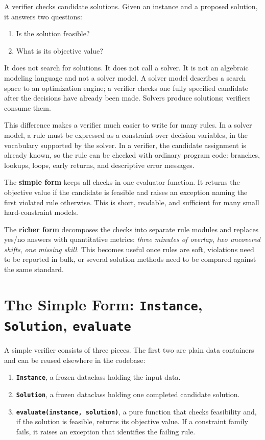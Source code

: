 A verifier checks candidate solutions. Given an instance and a proposed
solution, it answers two questions:

\begin{enumerate}
\item
  Is the solution feasible?
\item
  What is its objective value?
\end{enumerate}

It does not search for solutions. It does not call a solver. It is not
an algebraic modeling language and not a solver model. A solver model
describes a search space to an optimization engine; a verifier checks
one fully specified candidate after the decisions have already been
made. Solvers produce solutions; verifiers consume them.

This difference makes a verifier much easier to write for many rules. In
a solver model, a rule must be expressed as a constraint over decision
variables, in the vocabulary supported by the solver. In a verifier, the
candidate assignment is already known, so the rule can be checked with
ordinary program code: branches, lookups, loops, early returns, and
descriptive error messages.

The \textbf{simple form} keeps all checks in one evaluator function. It
returns the objective value if the candidate is feasible and raises an
exception naming the first violated rule otherwise. This is short,
readable, and sufficient for many small hard-constraint models.

The \textbf{richer form} decomposes the checks into separate rule
modules and replaces yes/no answers with quantitative metrics:
\emph{three minutes of overlap}, \emph{two uncovered shifts}, \emph{one
missing skill}. This becomes useful once rules are soft, violations need
to be reported in bulk, or several solution methods need to be compared
against the same standard.

\section{\texorpdfstring{The Simple Form: \texttt{Instance}, \texttt{Solution}, \texttt{evaluate}}{The Simple Form: Instance, Solution, evaluate}}\label{sec:4.2}

A simple verifier consists of three pieces. The first two are plain data
containers and can be reused elsewhere in the codebase:

\begin{enumerate}
\item
  \textbf{\lstinline!Instance!}, a frozen dataclass
  holding the input data.
\item
  \textbf{\lstinline!Solution!}, a frozen dataclass
  holding one completed candidate solution.
\item
  \textbf{\lstinline!evaluate(instance, solution)!}, a
  pure function that checks feasibility and, if the solution is
  feasible, returns its objective value. If a constraint family fails,
  it raises an exception that identifies the failing rule.
\end{enumerate}

